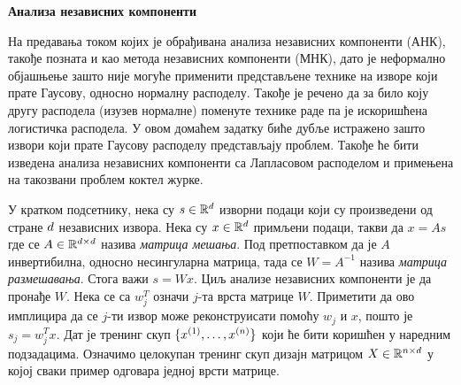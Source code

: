 \item {} {\bf Анализа независних компоненти}

На предавања током којих је обрађивана анализа независних компоненти (АНК), такође позната и као метода независних компоненти (МНК), дато је неформално објашњење зашто није могуће применити представљене технике на изворе који прате Гаусову, односно нормалну расподелу. Такође је речено да за било коју другу расподела (изузев нормалне) поменуте технике раде па је искоришћена логистичка расподела. У овом домаћем задатку биће дубље истражено зашто извори који прате Гаусову расподелу представљају проблем. Такође ће бити изведена анализа независних компоненти са Лапласовом расподелом и примењена на такозвани проблем коктел журке.

У кратком подсетнику, нека су $s \in \mathbb{R}^{d}$ изворни подаци који су произведени од стране ${d}$ независних извора. Нека су $x \in \mathbb{R}^{d}$ примљени подаци, такви да $x = As$ где се $A\in\mathbb{R}^{{d} \times {d}}$ назива \emph{матрица мешања}. Под претпоставком да је $A$ инвертибилна, односно несингуларна матрица, тада се $W = A^{-1}$ назива \emph{матрица размешавања}. Стога важи $s = Wx$. Циљ анализе независних компоненти је да пронађе $W$. Нека се са $w_j^T$ означи $j$-та врста матрице $W$. Приметити да ово имплицира да се $j$-ти извор може реконструисати помоћу $w_j$ и $x$, пошто је $s_j = w_j^T x$. Дат је тренинг скуп $\{x^{(1)},\ldots,x^{({n})}\}$ који ће бити коришћен у наредним подзадацима. Означимо целокупан тренинг скуп дизајн матрицом $X \in \mathbb{R}^{{n} \times {d}}$ у којој сваки пример одговара једној врсти матрице.

\begin{enumerate}
    

\ifnum{} {
  
} \fi

    
\ifnum{} {
  
} \fi


    
\ifnum{} {
  
} \fi
\end{enumerate}
